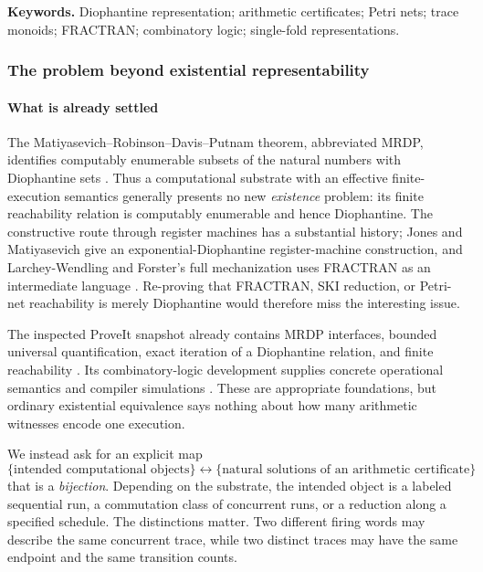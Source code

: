 \documentclass[11pt,a4paper]{article}
\theoremstyle{definition}
\theoremstyle{remark}
\begin{document}
\vspace{3pt}
\noindent\textbf{Keywords.} Diophantine representation; arithmetic certificates; Petri nets; trace monoids; FRACTRAN; combinatory logic; single-fold representations.

\subsubsection{The problem beyond existential representability}
\paragraph{What is already settled}
The Matiyasevich--Robinson--Davis--Putnam theorem, abbreviated MRDP, identifies computably enumerable subsets of the natural numbers with Diophantine sets \cite{mat1970}. Thus a computational substrate with an effective finite-execution semantics generally presents no new \emph{existence} problem: its finite reachability relation is computably enumerable and hence Diophantine. The constructive route through register machines has a substantial history; Jones and Matiyasevich give an exponential-Diophantine register-machine construction, and Larchey-Wendling and Forster's full mechanization uses FRACTRAN as an intermediate language \cite{jm1984,lf2019}. Re-proving that FRACTRAN, SKI reduction, or Petri-net reachability is merely Diophantine would therefore miss the interesting issue.

The inspected ProveIt snapshot already contains MRDP interfaces, bounded universal quantification, exact iteration of a Diophantine relation, and finite reachability \cite{repo-h10,repo-trace}. Its combinatory-logic development supplies concrete operational semantics and compiler simulations \cite{repo-cl}. These are appropriate foundations, but ordinary existential equivalence says nothing about how many arithmetic witnesses encode one execution.

We instead ask for an explicit map
\[
 \{\text{intended computational objects}\}
 \longleftrightarrow
 \{\text{natural solutions of an arithmetic certificate}\}
\]
that is a \emph{bijection}. Depending on the substrate, the intended object is a labeled sequential run, a commutation class of concurrent runs, or a reduction along a specified schedule. The distinctions matter. Two different firing words may describe the same concurrent trace, while two distinct traces may have the same endpoint and the same transition counts.
\end{document}
